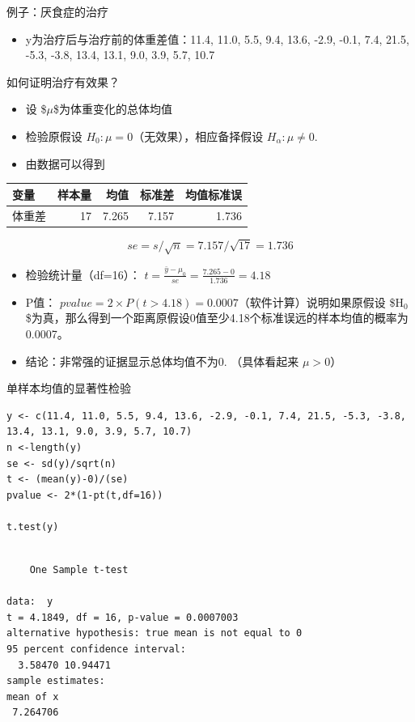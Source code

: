\documentclass[presentation]{beamer}
\begin{document}
\begin{frame}[label={sec:orge1b49f2}]{例子：厌食症的治疗}
\begin{itemize}
\item y为治疗后与治疗前的体重差值：11.4, 11.0, 5.5, 9.4, 13.6, -2.9, -0.1, 7.4, 21.5, -5.3, -3.8, 13.4, 13.1, 9.0, 3.9, 5.7, 10.7
\end{itemize}

\alert{如何证明治疗有效果？}  
\begin{itemize}
\item 设 \$\(\mu\)\$为体重变化的总体均值
\item 检验原假设  \(H_0: \mu=0\)（无效果），相应备择假设 \(H_{\alpha}: \mu \neq 0\).
\item 由数据可以得到
\end{itemize}

\begin{center}
\begin{tabular}{lrrrr}
变量 & 样本量 & 均值 & 标准差 & 均值标准误\\
\hline
体重差 & 17 & 7.265 & 7.157 & 1.736\\
\end{tabular}
\end{center}

$$se=s/\sqrt n=7.157/\sqrt {17}=1.736$$

\begin{itemize}
\item 检验统计量（df=16）： \(t=\frac{\bar y - \mu_0}{se}=\frac{7.265-0}{1.736}=4.18\)

\item P值： \(pvalue=2 \times P(t>4.18)=0.0007\)（软件计算）说明如果原假设 \$H\(_{\text{0}}\)\$为真，那么得到一个距离原假设0值至少4.18个标准误远的样本均值的概率为 0.0007。

\item 结论：非常强的证据显示总体均值不为0. （具体看起来 \(\mu >0\)）
\end{itemize}
\end{frame}

\begin{frame}[fragile,label={sec:org68de002}]{单样本均值的显著性检验}
 \begin{verbatim}
y <- c(11.4, 11.0, 5.5, 9.4, 13.6, -2.9, -0.1, 7.4, 21.5, -5.3, -3.8, 13.4, 13.1, 9.0, 3.9, 5.7, 10.7)
n <-length(y)
se <- sd(y)/sqrt(n)
t <- (mean(y)-0)/(se)
pvalue <- 2*(1-pt(t,df=16))

t.test(y)
\end{verbatim}

\begin{verbatim}

	One Sample t-test

data:  y
t = 4.1849, df = 16, p-value = 0.0007003
alternative hypothesis: true mean is not equal to 0
95 percent confidence interval:
  3.58470 10.94471
sample estimates:
mean of x 
 7.264706 

\end{verbatim}
\end{frame}
\end{document}
